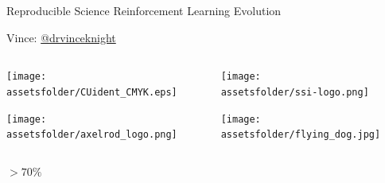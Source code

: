 \documentclass{beamer}
\newcommand{\assetsfolder}{./assets}
\begin{document}
    \begin{frame}
        \begin{center}
            \Huge  
                Reproducible Science
                Reinforcement Learning
                Evolution

               \vfill

            \Large
               Vince: \href{https://twitter.com/drvinceknight}{@drvinceknight}\\
        \end{center}
    \end{frame}

    \begin{frame}
               \begin{columns}
                   \begin{column}{.45\textwidth}
                       \begin{center}
                       \texttt{[image: \\assetsfolder/CUident\_CMYK.eps]}
                       \end{center}

                       \begin{center}
                       \texttt{[image: \\assetsfolder/axelrod\_logo.png]}
                       \end{center}
                   \end{column}
                   \begin{column}{.45\textwidth}
                       \begin{center}
                       \texttt{[image: \\assetsfolder/ssi-logo.png]}
                       \end{center}

                       \pause
                       \begin{center}
                       \texttt{[image: \\assetsfolder/flying\_dog.jpg]}
                       \end{center}
                   \end{column}
               \end{columns}
    \end{frame}

    \begin{frame}
        \begin{center}
            \fontsize{60}{70}\selectfont \(> 70\%\)
        \end{center}

    \end{frame}
\end{document}
